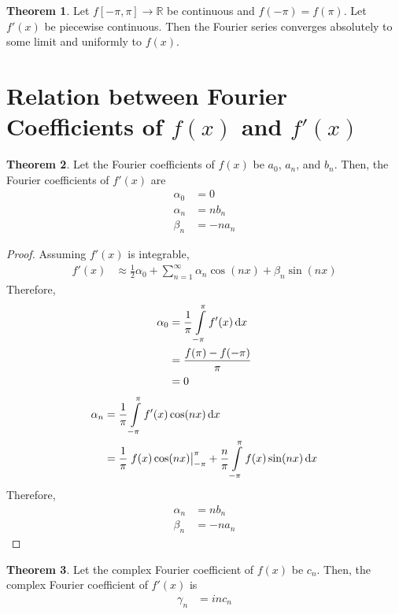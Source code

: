 \documentclass[fleqn, a4paper, 12pt, twoside]{article}
\theoremstyle{definition}
\theoremstyle{theorem}
\newtheorem{theorem}{Theorem}
\begin{document}
\begin{theorem}
	Let $f[-\pi,\pi] \to \mathbb{R}$ be continuous and $f(-\pi) = f(\pi)$.
	Let $f'(x)$ be piecewise continuous.
	Then the Fourier series converges absolutely to some limit and uniformly to $f(x)$.
\end{theorem}

\section{Relation between Fourier Coefficients of $f(x)$ and $f'(x)$}

\begin{theorem}
	Let the Fourier coefficients of $f(x)$ be $a_0$, $a_n$, and $b_n$.
	Then, the Fourier coefficients of $f'(x)$ are
	\begin{align*}
		\alpha_0 &= 0\\
		\alpha_n &= n b_n\\
		\beta_n &= -n a_n
	\end{align*}
\end{theorem}

\begin{proof}
	Assuming $f'(x)$ is integrable,
	\begin{align*}
		f'(x) &\approx \frac{1}{2} \alpha_0 + \sum\limits_{n = 1}^{\infty} \alpha_n \cos(n x) + \beta_n \sin(n x)
	\end{align*}
	Therefore,
	\begin{align*}
		\alpha_0 &= \frac{1}{\pi} \int\limits_{-\pi}^{\pi} f'(x) \dif x\\
		&= \frac{f(\pi) - f(-\pi)}{\pi}\\
		&= 0
	\end{align*}
	\begin{align*}
		\alpha_n &= \frac{1}{\pi} \int\limits_{-\pi}^{\pi} f'(x) \cos(n x) \dif x\\
		&= \frac{1}{\pi} \left. f(x) \cos(n x) \right|_{-\pi}^{\pi} + \frac{n}{\pi} \int\limits_{-\pi}^{\pi} f(x) \sin(n x) \dif x
	\end{align*}
	Therefore,
	\begin{align*}
		\alpha_n &= n b_n\\
		\beta_n &= -n a_n
	\end{align*}
\end{proof}

\begin{theorem}
	Let the complex Fourier coefficient of $f(x)$ be $c_n$.
	Then, the complex Fourier coefficient of $f'(x)$ is
	\begin{align*}
		\gamma_n &= i n c_n
	\end{align*}
\end{theorem}
\end{document}
